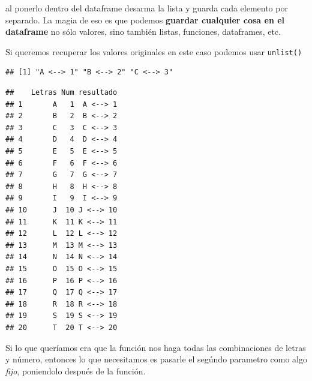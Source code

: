 \documentclass[]{book}
\newenvironment{Shaded}{\begin{snugshade}}{\end{snugshade}}
\newcommand{\DataTypeTok}[1]{\textcolor[rgb]{0.13,0.29,0.53}{#1}}
\newcommand{\DecValTok}[1]{\textcolor[rgb]{0.00,0.00,0.81}{#1}}
\newcommand{\KeywordTok}[1]{\textcolor[rgb]{0.13,0.29,0.53}{\textbf{#1}}}
\newcommand{\NormalTok}[1]{#1}
\newcommand{\OperatorTok}[1]{\textcolor[rgb]{0.81,0.36,0.00}{\textbf{#1}}}
\newcommand{\StringTok}[1]{\textcolor[rgb]{0.31,0.60,0.02}{#1}}
\begin{document}
al ponerlo dentro del dataframe desarma la lista y guarda cada elemento por separado.
La magia de eso es que podemos \textbf{guardar cualquier cosa en el dataframe} no sólo valores, sino también listas, funciones, dataframes, etc.

Si queremos recuperar los valores originales en este caso podemos usar \texttt{unlist()}

\begin{Shaded}
\end{Shaded}

\begin{verbatim}
## [1] "A <--> 1" "B <--> 2" "C <--> 3"
\end{verbatim}

\begin{Shaded}
\end{Shaded}

\begin{verbatim}
##    Letras Num resultado
## 1       A   1  A <--> 1
## 2       B   2  B <--> 2
## 3       C   3  C <--> 3
## 4       D   4  D <--> 4
## 5       E   5  E <--> 5
## 6       F   6  F <--> 6
## 7       G   7  G <--> 7
## 8       H   8  H <--> 8
## 9       I   9  I <--> 9
## 10      J  10 J <--> 10
## 11      K  11 K <--> 11
## 12      L  12 L <--> 12
## 13      M  13 M <--> 13
## 14      N  14 N <--> 14
## 15      O  15 O <--> 15
## 16      P  16 P <--> 16
## 17      Q  17 Q <--> 17
## 18      R  18 R <--> 18
## 19      S  19 S <--> 19
## 20      T  20 T <--> 20
\end{verbatim}

Si lo que queríamos era que la función nos haga todas las combinaciones de letras y número, entonces lo que necesitamos es pasarle el segúndo parametro como algo \emph{fijo}, poniendolo después de la función.

\begin{Shaded}
\end{Shaded}
\end{document}
